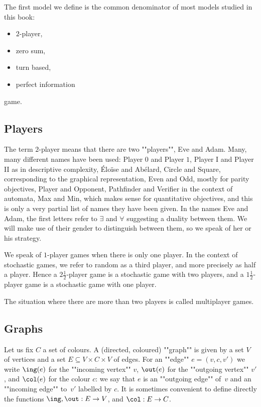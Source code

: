The first model we define is the common denominator of most models studied in this book:
\begin{itemize}
	\item $2$-player,
	\item zero sum,
	\item turn based,
	\item perfect information
\end{itemize}
game.

\subsection*{Players}
The term $2$-player means that there are two ""players"", Eve and Adam.
Many, many different names have been used: Player $0$ and Player $1$, 
Player I and Player II as in descriptive complexity,
{\'E}lo{\"i}se and Ab{\'e}lard, Circle and Square, corresponding to the graphical representation, 
Even and Odd, mostly for parity objectives, Player and Opponent, Pathfinder and Verifier in the context of automata,
Max and Min, which makes sense for quantitative objectives,
and this is only a very partial list of names they have been given.
In the names Eve and Adam, the first letters refer to $\exists$ and $\forall$ suggesting a duality between them.
We will make use of their gender to distinguish between them, so we speak of her or his strategy.

We speak of $1$-player games when there is only one player.
In the context of stochastic games, we refer to random as a third player, and more precisely as half a player.
Hence a $2\frac{1}{2}$-player game is a stochastic game with two players,
and a $1\frac{1}{2}$-player game is a stochastic game with one player.

The situation where there are more than two players is called multiplayer games.

\subsection*{Graphs}
Let us fix $C$ a set of colours. 
A (directed, coloured) ""graph"" is given by a set $V$ of vertices and a set $E \subseteq V \times C \times V$ of edges.
For an ""edge"" $e = (v,c,v')$ we write $\ing(e)$ for the ""incoming vertex"" $v$,
$\out(e)$ for the ""outgoing vertex"" $v'$, and $\col(e)$ for the colour $c$:
we say that $e$ is an ""outgoing edge"" of~$v$ and an ""incoming edge"" to~$v'$ labelled by $c$.
It is sometimes convenient to define directly the functions $\ing,\out : E \to V$, and $\col : E \to C$.

